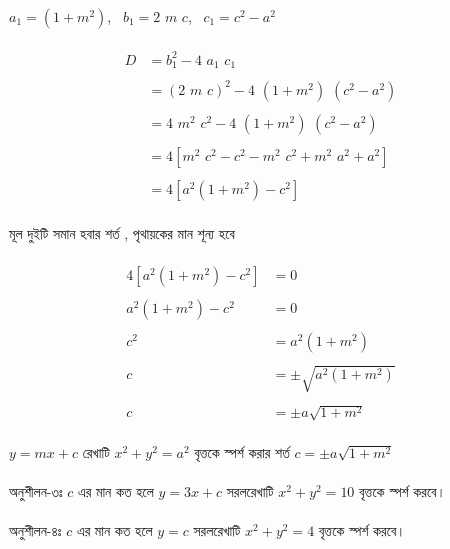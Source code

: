 \documentclass{article}
\begin{document}
\\ 
	$a_1=(1+m^2)$,\,\,\, $b_1=2\,\,m\,\,c$,\,\,\, $c_1=c^2-a^2$\\
	\\
	\begin{align*}
		D&=b_1^2-4\,\,a_1\,\,c_1\\
		\\
		&=(2\,\,m\,\,c)^2-4\,\,(1+m^2)\,\,(c^2-a^2)\\
		\\
		&=4\,\,m^2\,\,c^2-4\,\,(1+m^2)\,\,(c^2-a^2)\\
		\\
		&=4[m^2\,\,c^2-c^2-m^2\,\,c^2+m^2\,\,a^2+a^2]\\
		\\
		&=4[a^2(1+m^2)-c^2]
	\end{align*}
\\
মূল দুইটি সমান হবার শর্ত , পৃথায়কের মান  শূন্য হবে \\
\\
	\begin{align*}
4[a^2(1+m^2)-c^2]&=0\\
\\
a^2(1+m^2)-c^2&=0\\
\\
c^2&=a^2(1+m^2)\\
\\
c&=\pm \sqrt{a^2(1+m^2)}\\
\\
c&=\pm a\sqrt{1+m^2}
\end{align*}
\\
$y=mx+c$ রেখাটি  $x^2+y^2=a^2$ বৃত্তকে স্পর্শ করার শর্ত  $c=\pm a\sqrt{1+m^2}$\\
\\ 
অনুশীলন-৩ঃ  $c$ এর মান কত হলে  $y=3x+c$ সরলরেখাটি $x^2+y^2=10$ বৃত্তকে স্পর্শ করবে। \\
\\
অনুশীলন-৪ঃ   $c$ এর মান কত হলে  $y=c$ সরলরেখাটি $x^2+y^2=4$ বৃত্তকে স্পর্শ করবে। \\
\end{document}

